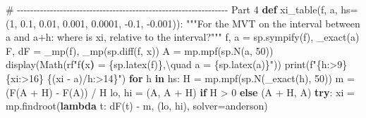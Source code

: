 \documentclass[
  letterpaper,
  DIV=11,
  numbers=noendperiod]{scrreprt}
\newenvironment{Shaded}{\begin{snugshade}}{\end{snugshade}}
\newcommand{\BuiltInTok}[1]{\textcolor[rgb]{0.00,0.23,0.31}{#1}}
\newcommand{\CommentTok}[1]{\textcolor[rgb]{0.37,0.37,0.37}{#1}}
\newcommand{\ControlFlowTok}[1]{\textcolor[rgb]{0.00,0.23,0.31}{\textbf{#1}}}
\newcommand{\DecValTok}[1]{\textcolor[rgb]{0.68,0.00,0.00}{#1}}
\newcommand{\ErrorTok}[1]{\textcolor[rgb]{0.68,0.00,0.00}{#1}}
\newcommand{\FloatTok}[1]{\textcolor[rgb]{0.68,0.00,0.00}{#1}}
\newcommand{\KeywordTok}[1]{\textcolor[rgb]{0.00,0.23,0.31}{\textbf{#1}}}
\newcommand{\NormalTok}[1]{\textcolor[rgb]{0.00,0.23,0.31}{#1}}
\newcommand{\OperatorTok}[1]{\textcolor[rgb]{0.37,0.37,0.37}{#1}}
\newcommand{\SpecialCharTok}[1]{\textcolor[rgb]{0.37,0.37,0.37}{#1}}
\newcommand{\SpecialStringTok}[1]{\textcolor[rgb]{0.13,0.47,0.30}{#1}}
\newcommand{\StringTok}[1]{\textcolor[rgb]{0.13,0.47,0.30}{#1}}
\newcommand{\VerbatimStringTok}[1]{\textcolor[rgb]{0.13,0.47,0.30}{#1}}
\theoremstyle{plain}
\theoremstyle{plain}
\theoremstyle{definition}
\theoremstyle{definition}
\theoremstyle{definition}
\theoremstyle{plain}
\theoremstyle{plain}
\theoremstyle{remark}
\begin{document}
\begin{Shaded}
\begin{Highlighting}[]
\CommentTok{\# {-}{-}{-}{-}{-}{-}{-}{-}{-}{-}{-}{-}{-}{-}{-}{-}{-}{-}{-}{-}{-}{-}{-}{-}{-}{-}{-}{-}{-}{-}{-}{-}{-}{-}{-}{-}{-}{-}{-}{-}{-}{-}{-}{-}{-}{-}{-}{-}{-}{-}{-}{-}{-}{-}{-}{-}{-}{-}{-}{-}{-}{-}{-}{-} Part 4}
\KeywordTok{def}\NormalTok{ xi\_table(f, a, hs}\OperatorTok{=}\NormalTok{(}\DecValTok{1}\NormalTok{, }\FloatTok{0.1}\NormalTok{, }\FloatTok{0.01}\NormalTok{, }\FloatTok{0.001}\NormalTok{, }\FloatTok{0.0001}\NormalTok{, }\OperatorTok{{-}}\FloatTok{0.1}\NormalTok{, }\OperatorTok{{-}}\FloatTok{0.001}\NormalTok{)):}
    \CommentTok{"""For the MVT on the interval between a and a+h: where is xi, relative to the interval?"""}
\NormalTok{    f, a }\OperatorTok{=}\NormalTok{ sp.sympify(f), \_exact(a)}
\NormalTok{    F, dF }\OperatorTok{=}\NormalTok{ \_mp(f), \_mp(sp.diff(f, x))}
\NormalTok{    A }\OperatorTok{=}\NormalTok{ mp.mpf(sp.N(a, }\DecValTok{50}\NormalTok{))}
\NormalTok{    display(Math(}\VerbatimStringTok{rf"f}\KeywordTok{(}\VerbatimStringTok{x}\KeywordTok{)}\VerbatimStringTok{ = }\SpecialCharTok{\{}\NormalTok{sp}\SpecialCharTok{.}\NormalTok{latex(f)}\SpecialCharTok{\}}\VerbatimStringTok{,}\ErrorTok{\textbackslash{}}\VerbatimStringTok{quad a = }\SpecialCharTok{\{}\NormalTok{sp}\SpecialCharTok{.}\NormalTok{latex(a)}\SpecialCharTok{\}}\VerbatimStringTok{"}\NormalTok{))}
    \BuiltInTok{print}\NormalTok{(}\SpecialStringTok{f"}\SpecialCharTok{\{}\StringTok{\textquotesingle{}h\textquotesingle{}}\SpecialCharTok{:\textgreater{}9\}}\SpecialStringTok{ }\SpecialCharTok{\{}\StringTok{\textquotesingle{}xi\textquotesingle{}}\SpecialCharTok{:\textgreater{}16\}}\SpecialStringTok{ }\SpecialCharTok{\{}\StringTok{\textquotesingle{}(xi {-} a)/h\textquotesingle{}}\SpecialCharTok{:\textgreater{}14\}}\SpecialStringTok{"}\NormalTok{)}
    \ControlFlowTok{for}\NormalTok{ h }\KeywordTok{in}\NormalTok{ hs:}
\NormalTok{        H }\OperatorTok{=}\NormalTok{ mp.mpf(sp.N(\_exact(h), }\DecValTok{50}\NormalTok{))}
\NormalTok{        m }\OperatorTok{=}\NormalTok{ (F(A }\OperatorTok{+}\NormalTok{ H) }\OperatorTok{{-}}\NormalTok{ F(A)) }\OperatorTok{/}\NormalTok{ H}
\NormalTok{        lo, hi }\OperatorTok{=}\NormalTok{ (A, A }\OperatorTok{+}\NormalTok{ H) }\ControlFlowTok{if}\NormalTok{ H }\OperatorTok{\textgreater{}} \DecValTok{0} \ControlFlowTok{else}\NormalTok{ (A }\OperatorTok{+}\NormalTok{ H, A)}
        \ControlFlowTok{try}\NormalTok{:}
\NormalTok{            xi }\OperatorTok{=}\NormalTok{ mp.findroot(}\KeywordTok{lambda}\NormalTok{ t: dF(t) }\OperatorTok{{-}}\NormalTok{ m, (lo, hi), solver}\OperatorTok{=}\StringTok{\textquotesingle{}anderson\textquotesingle{}}\NormalTok{)}

\end{Highlighting}
\end{Shaded}
\end{document}
